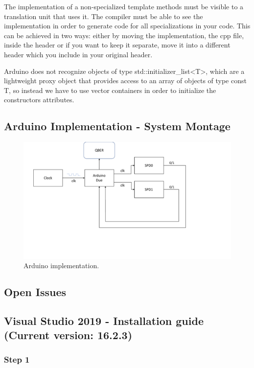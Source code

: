 \begin{refsection}
The implementation of a non-specialized template methods must be visible to a translation unit that uses it. The compiler must be able to see the implementation in order to generate code for all specializations in your code. This can be achieved in two ways: either by moving the implementation, the cpp file, inside the header or if you want to keep it separate, move it into a different header which you include in your original header.

Arduino does not recognize objects of type std::initializer\_list<T>, which are a lightweight proxy object that provides access to an array of objects of type const T, so instead we have to use vector containers in order to initialize the constructors attributes.


\subsection{Arduino Implementation - System Montage}
\begin{figure}[H]
	\centering
	\includegraphics[width=1\linewidth]{./sdf/arduino_quantum_rx/figures/montageDiagram.pdf}
	\caption{Arduino implementation.}
	\label{montage}
\end{figure}



\subsection{Open Issues}

\clearpage
\subsection{Visual Studio 2019 - Installation guide (Current version: 16.2.3)}

\subsubsection{Step 1}


\end{refsection}
